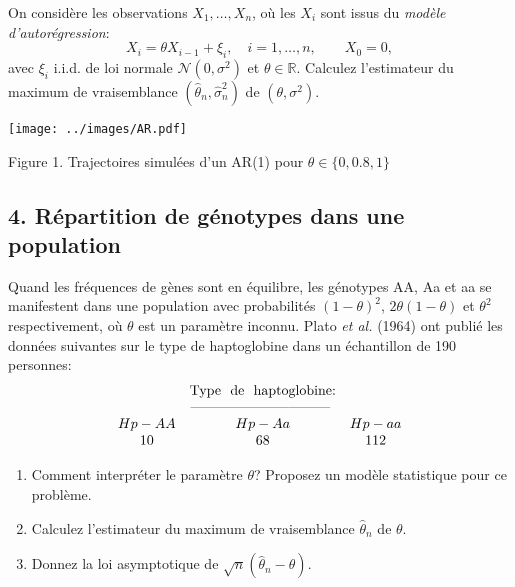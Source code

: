 \documentclass[a4paper,11pt,fleqn]{article}
\newcommand{\R}{\ensuremath{\mathbb{R}}}
\newcommand{\1}{\ensuremath{\mathbbm{1}}}
\begin{document}
On consid\`ere les observations $X_1,\dots,X_n$, o\`u les $X_i$
sont issus du {\it mod\`ele d'autor\'egression}:
$$
X_i=\theta X_{i-1} + \xi_i, \quad i=1,\dots,n, \quad\quad X_0=0,
$$
avec $\xi_i$ i.i.d. de loi normale ${\mathcal N}(0,\sigma^2)$ et
$\theta\in \R$.
Calculez l'estimateur du maximum de vraisemblance  $(\hat \theta_n,\hat \sigma_{n}^2)$ de $(\theta,\sigma^2)$.



\centerline{\texttt{[image: ../images/AR.pdf]}}
\vspace{-0.17cm}

\centerline{Figure 1. Trajectoires simul\'ees d'un AR(1) pour $\theta\in\{0,0.8,1\}$}


\subsection*{4. R\'epartition de g\'enotypes dans une population}

Quand les fr\'equences de g\`enes sont en \'equilibre, les
g\'enotypes AA, Aa et aa se manifestent dans une population avec
probabilit\'es $(1-\theta)^2$, $2\theta(1-\theta)$ et $\theta^2$
respectivement, o\`u $\theta$ est un param\`etre inconnu. Plato {\it et
al.} (1964) ont publi\'e les donn\'ees suivantes sur le type de
haptoglobine dans un \'echantillon de 190 personnes:
$$
\begin{array}{ccc}
&\text{Type \ de \ haptoglobine:}&\\\hspace{6mm}
&\text{------------------------------ }&\\
 Hp-AA& Hp-Aa & Hp-aa \\
 10&68&112
\end{array}
$$
\begin{enumerate}
\item Comment interpr\'eter le param\`etre $\theta$? Proposez un mod\`ele statistique pour ce probl\`eme.
\item  Calculez l'estimateur du maximum de vraisemblance $\hat \theta_n$ de $\theta$.
\item  Donnez la loi asymptotique de $\sqrt{n}(\hat \theta_n -
\theta)$.
\end{enumerate}
\end{document}
